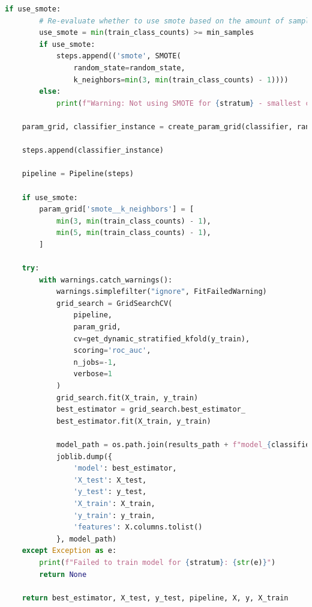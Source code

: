 \documentclass[12pt]{report}
\begin{document}
\begin{lstlisting}[language=Python,caption={ML\_training.py: Κοινές συναρτήσεις για την εκπαίδευση κατηγοριοποιητών}, label=lst:mltrainingcommon]
    if use_smote:
        # Re-evaluate whether to use smote based on the amount of samples available
        use_smote = min(train_class_counts) >= min_samples
        if use_smote:
            steps.append(('smote', SMOTE(
                random_state=random_state,
                k_neighbors=min(3, min(train_class_counts) - 1))))
        else:
            print(f"Warning: Not using SMOTE for {stratum} - smallest class has {min(train_class_counts)} samples")

    param_grid, classifier_instance = create_param_grid(classifier, random_state, y if classifier == 'XGBOOST' else None)

    steps.append(classifier_instance)

    pipeline = Pipeline(steps)

    if use_smote:
        param_grid['smote__k_neighbors'] = [
            min(3, min(train_class_counts) - 1),
            min(5, min(train_class_counts) - 1),
        ]

    try:
        with warnings.catch_warnings():
            warnings.simplefilter("ignore", FitFailedWarning)
            grid_search = GridSearchCV(
                pipeline,
                param_grid,
                cv=get_dynamic_stratified_kfold(y_train),
                scoring='roc_auc',
                n_jobs=-1,
                verbose=1
            )
            grid_search.fit(X_train, y_train)
            best_estimator = grid_search.best_estimator_
            best_estimator.fit(X_train, y_train)

            model_path = os.path.join(results_path + f"model_{classifier}_{stratum}.joblib")
            joblib.dump({
                'model': best_estimator,
                'X_test': X_test,
                'y_test': y_test,
                'X_train': X_train,
                'y_train': y_train,
                'features': X.columns.tolist()
            }, model_path)
    except Exception as e:
        print(f"Failed to train model for {stratum}: {str(e)}")
        return None

    return best_estimator, X_test, y_test, pipeline, X, y, X_train
    \end{lstlisting}
\end{document}
